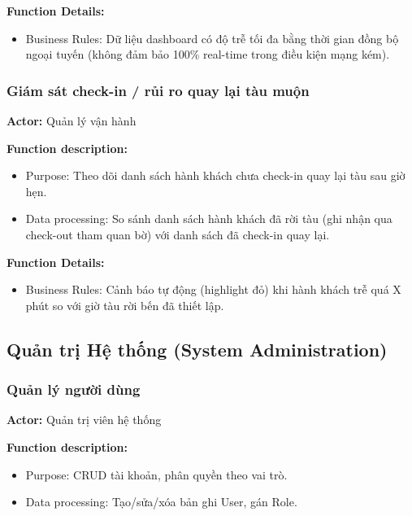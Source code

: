 \noindent\textbf{Function Details:}
\begin{itemize}
    \item Business Rules: Dữ liệu dashboard có độ trễ tối đa bằng thời gian đồng bộ ngoại tuyến (không đảm bảo 100\% real-time trong điều kiện mạng kém).
\end{itemize}

\subsubsection{Giám sát check-in / rủi ro quay lại tàu muộn}

\noindent\textbf{Actor:} Quản lý vận hành

\noindent\textbf{Function description:}
\begin{itemize}
    \item Purpose: Theo dõi danh sách hành khách chưa check-in quay lại tàu sau giờ hẹn.
    \item Data processing: So sánh danh sách hành khách đã rời tàu (ghi nhận qua check-out tham quan bờ) với danh sách đã check-in quay lại.
\end{itemize}

\noindent\textbf{Function Details:}
\begin{itemize}
    \item Business Rules: Cảnh báo tự động (highlight đỏ) khi hành khách trễ quá X phút so với giờ tàu rời bến đã thiết lập.
\end{itemize}


\subsection{Quản trị Hệ thống (System Administration)}

\subsubsection{Quản lý người dùng}

\noindent\textbf{Actor:} Quản trị viên hệ thống

\noindent\textbf{Function description:}
\begin{itemize}
    \item Purpose: CRUD tài khoản, phân quyền theo vai trò.
    \item Data processing: Tạo/sửa/xóa bản ghi User, gán Role.
\end{itemize}


